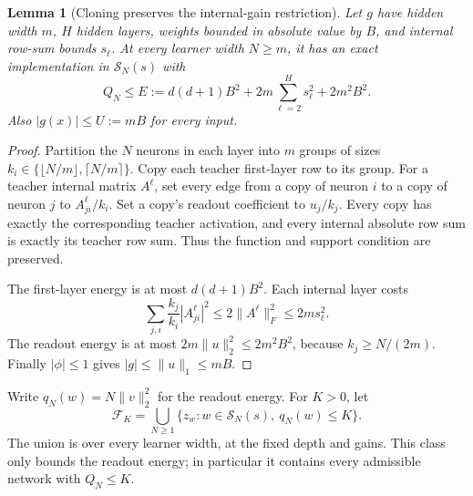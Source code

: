 \documentclass[11pt]{article}
\newtheorem{lemma}[theorem]{Lemma}
\theoremstyle{definition}\newtheorem{definition}[theorem]{Definition}
\theoremstyle{remark}\newtheorem{remark}[theorem]{Remark}
\begin{document}
\begin{lemma}[Cloning preserves the internal-gain restriction]
\label{lem:clone}
Let $g$ have hidden width $m$, $H$ hidden layers, weights bounded in absolute value by $B$, and internal row-sum bounds $s_\ell$. At every learner width $N\geq m$, it has an exact implementation in $\mathcal S_N(s)$ with
\begin{equation}
 Q_N\leq E:=d(d+1)B^2+2m\sum_{\ell=2}^H s_\ell^2+2m^2B^2.
 \label{eq:teacher-energy}
\end{equation}
Also $|g(x)|\leq U:=mB$ for every input.
\end{lemma}
\begin{proof}
Partition the $N$ neurons in each layer into $m$ groups of sizes
$k_i\in\{\lfloor N/m\rfloor,\lceil N/m\rceil\}$. Copy each teacher first-layer row to its group. For a teacher internal matrix $A^\ell$, set every edge from a copy of neuron $i$ to a copy of neuron $j$ to $A^\ell_{ji}/k_i$. Set a copy's readout coefficient to $u_j/k_j$.
Every copy has exactly the corresponding teacher activation, and every internal absolute row sum is exactly its teacher row sum. Thus the function and support condition are preserved.

The first-layer energy is at most $d(d+1)B^2$. Each internal layer costs
\[
 \sum_{j,i}\frac{k_j}{k_i}|A^\ell_{ji}|^2
 \leq2\|A^\ell\|_F^2
 \leq2m s_\ell^2.
\]
The readout energy is at most $2m\|u\|_2^2\leq2m^2B^2$, because $k_j\geq N/(2m)$. Finally $|\phi|\leq1$ gives $|g|\leq\|u\|_1\leq mB$.
\end{proof}

Write $q_N(w)=N\|v\|_2^2$ for the readout energy. For $K>0$, let
\[
 \mathcal F_K=\bigcup_{N\geq1}
    \{z_w:w\in\mathcal S_N(s),\ q_N(w)\leq K\}.
\]
The union is over every learner width, at the fixed depth and gains. This class only bounds the readout energy; in particular it contains every admissible network with $Q_N\leq K$.
\end{document}
